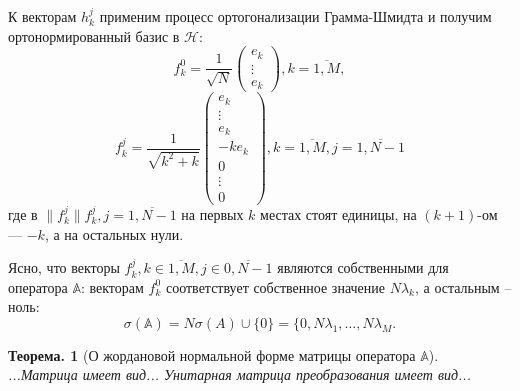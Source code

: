 \documentclass{article}
\newtheorem{thm}{Теорема. }
\begin{document}
К векторам \( h_k^j \) применим процесс ортогонализации Грамма-Шмидта и получим
ортонормированный базис в \( \mathcal{H} \):
\[ f_k^0 = \frac{1}{\sqrt{N}} \begin{pmatrix} e_k \\ \vdots \\ e_k \end{pmatrix}, k=\overline{1,M}, \]
\[
    f_k^j = \frac{1}{\sqrt{k^2+k}}
    \begin{pmatrix} e_k \\ \vdots \\ e_k \\ -ke_k \\ 0 \\ \vdots \\ 0 \end{pmatrix}, k=\overline{1,M}, j=\overline{1,N-1} \]
где в \( \|f_k^j\| f_k^j, j=\overline{1,N-1} \) на первых \( k \) местах стоят единицы, на \((k+1)\)-ом --- \( -k \),
а на остальных нули.

Ясно, что векторы \( f_k^j, k\in\overline{1,M}, j\in\overline{0,N-1} \)
являются собственными для оператора \( \mathbb{A} \):
векторам \( f_k^0 \) соответствует собственное значение \( N \lambda_k \),
а остальным -- ноль:
\[ \sigma(\mathbb{A}) = N \sigma(A)\cup\{0\} = \{ 0, N\lambda_1, \ldots, N\lambda_M. \]

\begin{thm}[О жордановой нормальной форме матрицы  оператора \( \mathbb{A} \)]
    ...Матрица имеет вид... Унитарная матрица преобразования имеет вид...
\end{thm}
\end{document}

